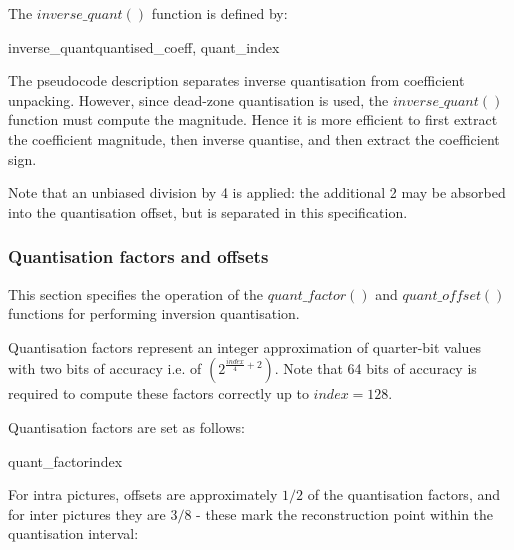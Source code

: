 The $inverse\_quant()$ function is defined by:

\begin{pseudo}{inverse\_quant}{quantised\_coeff, quant\_index}
\bsEND
{}
\end{pseudo}

\begin{informative}
The pseudocode description separates inverse quantisation from coefficient unpacking. However, 
since dead-zone quantisation is used, the $inverse\_quant()$ function must compute
the magnitude. Hence it is more efficient to first extract the coefficient magnitude,
then inverse quantise, and then extract the coefficient sign. 

Note that an unbiased division by 4 is applied: the additional 2 may be absorbed into
the quantisation offset, but is separated in this specification.
\end{informative}

\subsubsection{Quantisation factors and offsets}
\label{quantfacs}

This section specifies the operation of the $quant\_factor()$ and 
$quant\_offset()$ functions for performing inversion quantisation.

Quantisation factors represent an integer approximation of quarter-bit values 
with two bits of accuracy i.e. of $(2^{\frac{index}{4}+2})$. Note that 64 bits 
of accuracy is required to compute these factors correctly up to $index=128$.

Quantisation factors are set as follows:

\begin{pseudo}{quant\_factor}{index}
\bsEND
\end{pseudo}

For intra pictures, offsets are approximately $1/2$ of the 
quantisation factors, and for inter pictures they are $3/8$ - these
mark the reconstruction point within the quantisation interval:

